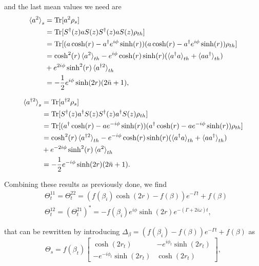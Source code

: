 \begin{apendicesenv}
\noindent and the last mean values we need are
\begin{equation}
	\begin{split}
		\braket{a^{2}}_s &= \text{Tr} [a^{2} \rho_{s}]\\
		&= \text{Tr} [S^\dagger (z) a S (z) S^\dagger (z) a S (z) \rho_{th}]\\
		&= \text{Tr} [ ( a \cosh(r) - a^\dagger e^{i\phi} \sinh(r)) (a \cosh(r) - a^\dagger e^{i\phi} \sinh(r)) \rho_{th}]\\
		&= \cosh^2 (r) \braket{a^{2}}_{th} - e^{i\phi}\cosh(r) \sinh(r) (\braket{a^{\dagger} a}_{th} + \braket{a a^\dagger}_{th})\\
		&+ e^{2i\phi}\sinh^2(r) \braket{a^{\dagger 2}}_{th}\\
		&= -\frac{1}{2} e^{i \phi} \sinh(2r) (2\bar{n} +1),
	\end{split}
\end{equation}

\begin{equation}
	\begin{split}
		\braket{a^{\dagger 2}}_s &= \text{Tr} [a^{\dagger 2} \rho_{s}]\\
		&= \text{Tr} [S^\dagger (z) a^\dagger S (z) S^\dagger (z) a^\dagger S (z) \rho_{th}]\\
		&= \text{Tr} [ (a^\dagger \cosh(r) - a e^{-i\phi} \sinh(r)) (a^\dagger \cosh(r) - a e^{-i\phi} \sinh(r)) \rho_{th}]\\
		&= \cosh^2 (r) \braket{a^{\dagger 2}}_{th} - e^{-i\phi}\cosh(r) \sinh(r) (\braket{a^{\dagger} a}_{th} + \braket{a a^\dagger}_{th}) \\
		&+ e^{-2i\phi} \sinh^2(r) \braket{a^2}_{th}\\
		&= -\frac{1}{2} e^{-i \phi} \sinh(2r) (2\bar{n} +1).
	\end{split}
\end{equation}

\noindent Combining these results as previously done, we find
\begin{align}
	&\Theta^{11}_t = \Theta^{22}_t = (f(\beta_i)\cosh(2r) - f(\beta))e^{-\Gamma t} + f(\beta)\\
	&\Theta^{12}_t = (\Theta^{21}_t )^* = -f(\beta_i) e^{i\phi} \sinh(2r) e^{-(\Gamma + 2i \omega)t},
\end{align}

\noindent that can be rewritten by introducing $\Delta_\beta = (f(\beta_i) - f(\beta)) e^{-\Gamma t} + f(\beta)$ as
\begin{equation}
    \Theta_s = f(\beta_t) 
    \begin{bmatrix}
        \cosh(2 r_t) & -e^{i \phi_t} \sinh(2r_t)\\
        -e^{-i \phi_t} \sinh(2r_t) & \cosh(2 r_t)
    \end{bmatrix},
\end{equation}


\end{apendicesenv}
